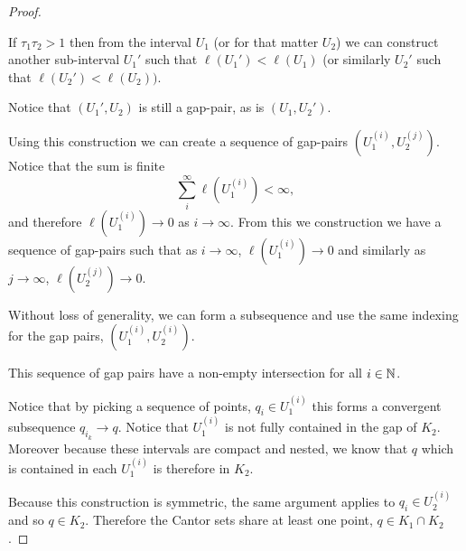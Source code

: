 \begin{proof}
    \begin{claim}
        If $\tau_1\tau_2 > 1$ then from the interval $U_1$ (or for that matter $U_2$) we can construct another sub-interval $U_1'$ such that $\ell(U_1') < \ell(U_1)$ (or similarly $U_2'$ such that $\ell(U_2')<\ell(U_2)).$
    \end{claim}
    Notice that $(U_1',U_2)$ is still a gap-pair, as is $(U_1,U_2')$.
    
    Using this construction we can create a sequence of gap-pairs $(U_1^{(i)}, U_2^{(j)})$.  Notice that the sum is finite $$\sum_i^\infty \ell(U_1^{(i)}) < \infty,$$ and therefore $\ell(U_1^{(i)}) \to 0$ as $i \to \infty$.   From this we construction we have a sequence of gap-pairs such that as $i \to \infty$, $\ell(U_1^{(i)}) \to 0$ and similarly as $j \to \infty$, $\ell(U_2^{(j)}) \to 0$.  
    
    Without loss of generality, we can form a subsequence and use the same indexing for the gap pairs, $(U_1^{(i)}, U_2^{(i)})$.  
    
    This sequence of gap pairs have a non-empty intersection for all $i \in \mathbb{N}$.  

    Notice that by picking a sequence of points, $q_{i} \in U_1^{(i)}$ this forms a convergent subsequence $q_{i_k} \to q$.  Notice that $U_1^{(i)}$ 
    is not fully contained in the gap of $K_2$.  Moreover because these intervals are compact and nested, we know that %
     $q$ which is contained in each $U_1^{(i)}$ is therefore in  $K_2$.  

    Because this construction is symmetric, the same argument applies to $q_{i} \in U_2^{(i)}$ and so $q \in K_2$.  Therefore the Cantor sets share at least one point, $q \in K_1 \cap K_2$.  

\end{proof}